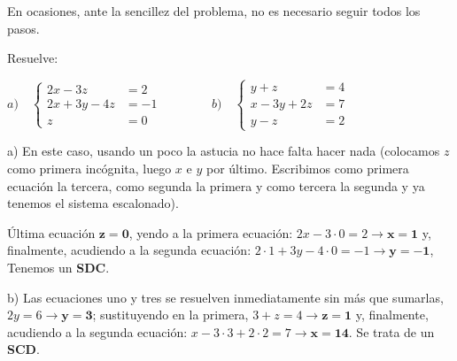 \begin{ejre} 
En ocasiones, ante la sencillez del problema, no es necesario seguir todos los pasos.

Resuelve: 

$a) \quad \begin{cases} 2x-3z&=2\\2x+3y-4z&=-1\\z&=0 \end{cases} \qquad \qquad b) \quad \begin{cases} y+z&=4\\x-3y+2z&=7\\y-z&=2 \end{cases}$
\end{ejre}
\begin{proofw}\renewcommand{\qedsymbol}{$\diamond$}
a) En este caso, usando un poco la astucia no hace falta hacer nada (colocamos $z$ como primera incógnita, luego $x$ e $y$ por último. Escribimos como primera ecuación la tercera, como segunda la primera y como tercera la segunda y ya tenemos el sistema escalonado). 

Última ecuación $\boldsymbol{z=0}$, yendo a la primera ecuación: $2x-3\cdot0=2 \to \boldsymbol{x=1}$ y, finalmente, acudiendo a la segunda ecuación: $2\cdot 1 +3y-4\cdot 0=-1 \to \boldsymbol{y=-1}$, Tenemos un \textbf{SDC}.

b) Las ecuaciones uno y tres se resuelven inmediatamente sin más que sumarlas, $2y=6 \to \boldsymbol{y=3}$; sustituyendo en la primera, $3+z=4 \to \boldsymbol{z=1}$ y, finalmente, acudiendo a la segunda ecuación: $x-3\cdot 3 +2\cdot 2=7 \to \boldsymbol{x=14}$. Se trata de un \textbf{SCD}.
\end{proofw}



